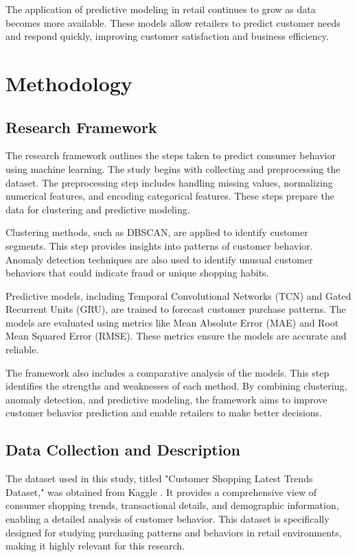 \documentclass[12pt, a4paper,twoside]{report}
\theoremstyle{plain} %
\theoremstyle{definition} %
\theoremstyle{remark} %
\numberwithin{equation}{chapter}
\begin{document}
The application of predictive modeling in retail continues to grow as data becomes more available. These models allow retailers to predict customer needs and respond quickly, improving customer satisfaction and business efficiency.

\clearpage
\chapter{Methodology}

\section{Research Framework}

The research framework outlines the steps taken to predict consumer behavior using machine learning. The study begins with collecting and preprocessing the dataset. The preprocessing step includes handling missing values, normalizing numerical features, and encoding categorical features. These steps prepare the data for clustering and predictive modeling.

Clustering methods, such as DBSCAN, are applied to identify customer segments. This step provides insights into patterns of customer behavior. Anomaly detection techniques are also used to identify unusual customer behaviors that could indicate fraud or unique shopping habits.

Predictive models, including Temporal Convolutional Networks (TCN) and Gated Recurrent Units (GRU), are trained to forecast customer purchase patterns. The models are evaluated using metrics like Mean Absolute Error (MAE) and Root Mean Squared Error (RMSE). These metrics ensure the models are accurate and reliable.

The framework also includes a comparative analysis of the models. This step identifies the strengths and weaknesses of each method. By combining clustering, anomaly detection, and predictive modeling, the framework aims to improve customer behavior prediction and enable retailers to make better decisions.

\section{Data Collection and Description}

The dataset used in this study, titled "Customer Shopping Latest Trends Dataset," was obtained from Kaggle \citep{bhadramohit2023}. It provides a comprehensive view of consumer shopping trends, transactional details, and demographic information, enabling a detailed analysis of customer behavior. This dataset is specifically designed for studying purchasing patterns and behaviors in retail environments, making it highly relevant for this research.
\end{document}
